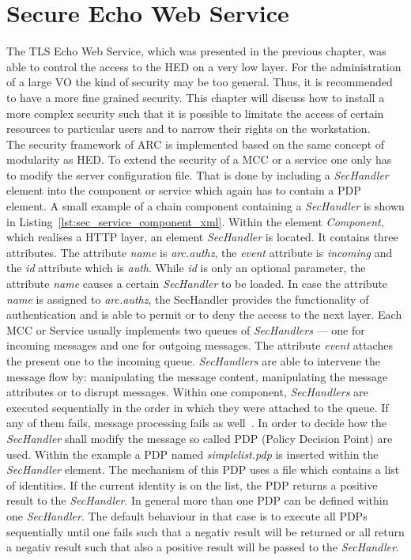 \chapter{Secure Echo Web Service}

The TLS Echo Web Service, which was presented in the previous chapter, was able to control the access to the HED on a very low layer. 
For the administration of a large VO the kind of security may be too general.
Thus, it is recommended to have a more fine grained security. 
This chapter will discuss how to install a more complex security such that it is possible to limitate the access of certain resources to particular users and to narrow their rights on the workstation.\\


The security framework of ARC is implemented based on the same concept of modularity as HED. 
To extend the security of a MCC or a service one only has to modify the server configuration file. That is done by including a \textit{SecHandler} element into the component or service which again has to contain a PDP element. A small example of a chain component containing a \textit{SecHandler} is shown in Listing~\ref{lst:sec_service_component_xml}. Within the element \textit{Component}, which realises a HTTP layer, an element \textit{SecHandler} is located. It contains three attributes. The  attribute \textit{name} is \textit{arc.authz}, the \textit{event} attribute is \textit{incoming} and the \textit{id} attribute which is \textit{auth}. 
While \textit{id} is only an optional parameter, the attribute \textit{name} causes a certain \textit{SecHandler} to be loaded.%
In case the attribute \textit{name} is assigned to \textit{arc.authz}, the SecHandler provides the functionality of authentication and is able to permit or to deny the access to the next layer. 
Each MCC or Service usually implements two queues of \textit{SecHandlers} --- one for incoming messages and one for outgoing messages. The attribute \textit{event} attaches the present one to the incoming queue. \textit{SecHandlers} are able to intervene the message flow by: manipulating the message content, manipulating the message attributes or to disrupt messages.
Within one component, \textit{SecHandlers} are executed sequentially in the order in which they were attached to the queue. If any of them fails, message processing fails as well~\cite{QIANG_2008}. In order to decide how the \textit{SecHandler} shall modify the message so called PDP (Policy Decision Point) are used. Within the example a PDP named \textit{simplelist.pdp} is inserted within the \textit{SecHandler} element. The mechanism of this PDP uses a file which contains a list of identities. If the current identity is on the list, the PDP returns a positive result to the \textit{SecHandler}. In general more than one PDP can be defined within one \textit{SecHandler}. The default behaviour in that case is to execute all PDPs sequentially until one fails such that a negativ result will be returned or all return a negativ result such that also a positive result will be passed to the \textit{SecHandler}.\\
